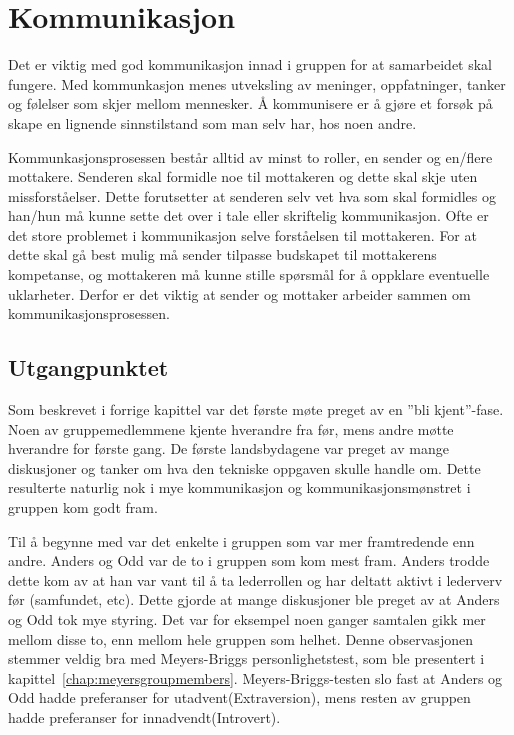 \section{Kommunikasjon}
Det er viktig med god kommunikasjon innad i gruppen for at samarbeidet skal fungere. 
Med kommunkasjon menes utveksling av meninger, oppfatninger, tanker og følelser som skjer mellom mennesker.
Å kommunisere er å gjøre et forsøk på skape en lignende sinnstilstand som man selv har, hos noen andre\citep{levin}.
\vspace{\secspace}

Kommunkasjonsprosessen består alltid av minst to roller, en sender og en/flere mottakere. 
Senderen skal formidle noe til mottakeren og dette skal skje uten missforståelser. 
Dette forutsetter at senderen selv vet hva som skal formidles og han/hun må kunne sette det over i tale eller skriftelig kommunikasjon. 
Ofte er det store problemet i kommunikasjon selve forståelsen til mottakeren. 
For at dette skal gå best mulig må sender tilpasse budskapet til mottakerens kompetanse, og mottakeren må kunne stille spørsmål for å oppklare eventuelle uklarheter. 
Derfor er det viktig at sender og mottaker arbeider sammen om kommunikasjonsprosessen\citep{levin}.

\subsection{Utgangpunktet}
Som beskrevet i forrige kapittel var det første møte preget av en ''bli kjent''-fase. 
Noen av gruppemedlemmene kjente hverandre fra før, mens andre møtte hverandre for første gang. 
De første landsbydagene var preget av mange diskusjoner og tanker om hva den tekniske oppgaven skulle handle om. 
Dette resulterte naturlig nok i mye kommunikasjon og kommunikasjonsmønstret i gruppen kom godt fram. 
\vspace{\secspace}

Til å begynne med var det enkelte i gruppen som var mer framtredende enn andre. 
Anders og Odd var de to i gruppen som kom mest fram. 
Anders trodde dette kom av at han var vant til å ta lederrollen og har deltatt aktivt i lederverv før (samfundet, etc).
Dette gjorde at mange diskusjoner ble preget av at Anders og Odd tok mye styring. 
Det var for eksempel noen ganger samtalen gikk mer mellom disse to, enn mellom hele gruppen som helhet. 
Denne observasjonen stemmer veldig bra med Meyers-Briggs personlighetstest, som ble presentert i kapittel~\ref{chap:meyersgroupmembers}.
Meyers-Briggs-testen slo fast at Anders og Odd hadde preferanser for utadvent(Extraversion), mens resten av gruppen hadde preferanser for innadvendt(Introvert). 
\vspace{\secspace}

